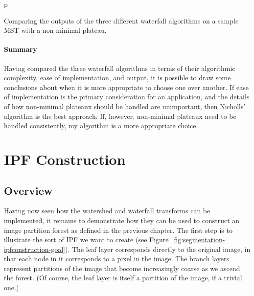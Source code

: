 \begin{stusubfig}{p}
	\hspace{4mm}%
\caption{Comparing the outputs of the three different waterfall algorithms on a sample MST with a non-minimal plateau.}
\label{fig:segmentation-waterfall-comparison}
\end{stusubfig}

\paragraph{Summary}

Having compared the three waterfall algorithms in terms of their algorithmic complexity, ease of implementation, and output, it is possible to draw some conclusions about when it is more appropriate to choose one over another. If ease of implementation is the primary consideration for an application, and the details of how non-minimal plateaux should be handled are unimportant, then Nicholls' algorithm is the best approach. If, however, non-minimal plateaux need to be handled consistently, my algorithm is a more appropriate choice.

\clearpage

\section{IPF Construction}
\label{sec:segmentation-ipfconstruction}

\subsection{Overview}

Having now seen how the watershed and waterfall transforms can be implemented, it remains to demonstrate how they can be used to construct an image partition forest as defined in the previous chapter. The first step is to illustrate the sort of IPF we want to create (see Figure~\ref{fig:segmentation-ipfconstruction-goal}). The leaf layer corresponds directly to the original image, in that each node in it corresponds to a pixel in the image. The branch layers represent partitions of the image that become increasingly coarse as we ascend the forest. (Of course, the leaf layer is itself a partition of the image, if a trivial one.)


